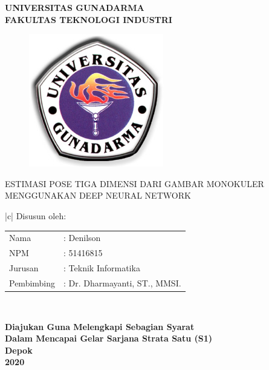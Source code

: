 \newpage


\begin{center}
\bfseries
{\Large UNIVERSITAS GUNADARMA}\\
{\Large FAKULTAS TEKNOLOGI INDUSTRI}\\

\vspace{1.0cm}

\begin{figure}[h]
  \begin{center}
    \includegraphics[scale=4.5]{gambar/LogoGunadarma.jpg}
  \end{center}
\end{figure}

{\Large ESTIMASI POSE TIGA DIMENSI DARI GAMBAR MONOKULER MENGGUNAKAN DEEP NEURAL NETWORK}

\vspace{1.5cm}

\begin{tabular}{|c|}
  \hline
  Disusun oleh: \\
  \begin{tabular}{ll}
  Nama& : Denilson \\[-5pt]
  NPM& : 51416815 \\[-5pt]
  Jurusan& : Teknik Informatika \\[-5pt]
  Pembimbing& : Dr. Dharmayanti, ST., MMSI.\\
  \end{tabular}\\
  \hline
\end{tabular}

\end{center}

\vspace{1.5cm}

\begin{center}
\bfseries
Diajukan Guna Melengkapi Sebagian Syarat \\
Dalam Mencapai Gelar Sarjana Strata Satu (S1)\\

Depok\\
2020 %
\end{center}

